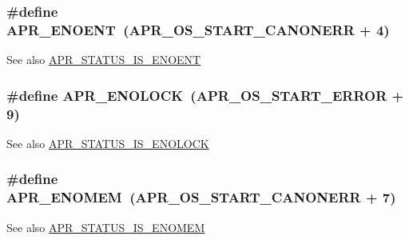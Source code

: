 \subsubsection[{\texorpdfstring{A\+P\+R\+\_\+\+E\+N\+O\+E\+NT}{APR_ENOENT}}]{\setlength{\rightskip}{0pt plus 5cm}\#define A\+P\+R\+\_\+\+E\+N\+O\+E\+NT~({\bf A\+P\+R\+\_\+\+O\+S\+\_\+\+S\+T\+A\+R\+T\+\_\+\+C\+A\+N\+O\+N\+E\+RR} + 4)}\hypertarget{group__APR__Error_gacc26a4afe01b6cc141f839be71fddf1c}{}\label{group__APR__Error_gacc26a4afe01b6cc141f839be71fddf1c}
\begin{DoxySeeAlso}{See also}
\hyperlink{group__APR__STATUS__IS_gad15c3b9bda78a88c02466a0d405c6047}{A\+P\+R\+\_\+\+S\+T\+A\+T\+U\+S\+\_\+\+I\+S\+\_\+\+E\+N\+O\+E\+NT} 
\end{DoxySeeAlso}
\subsubsection[{\texorpdfstring{A\+P\+R\+\_\+\+E\+N\+O\+L\+O\+CK}{APR_ENOLOCK}}]{\setlength{\rightskip}{0pt plus 5cm}\#define A\+P\+R\+\_\+\+E\+N\+O\+L\+O\+CK~({\bf A\+P\+R\+\_\+\+O\+S\+\_\+\+S\+T\+A\+R\+T\+\_\+\+E\+R\+R\+OR} + 9)}\hypertarget{group__APR__Error_ga9c411624c42f7562a5c6c3461bdcb0ec}{}\label{group__APR__Error_ga9c411624c42f7562a5c6c3461bdcb0ec}
\begin{DoxySeeAlso}{See also}
\hyperlink{group__APR__STATUS__IS_gaced66cdb08529210dbf2f6bcbba99258}{A\+P\+R\+\_\+\+S\+T\+A\+T\+U\+S\+\_\+\+I\+S\+\_\+\+E\+N\+O\+L\+O\+CK} 
\end{DoxySeeAlso}
\subsubsection[{\texorpdfstring{A\+P\+R\+\_\+\+E\+N\+O\+M\+EM}{APR_ENOMEM}}]{\setlength{\rightskip}{0pt plus 5cm}\#define A\+P\+R\+\_\+\+E\+N\+O\+M\+EM~({\bf A\+P\+R\+\_\+\+O\+S\+\_\+\+S\+T\+A\+R\+T\+\_\+\+C\+A\+N\+O\+N\+E\+RR} + 7)}\hypertarget{group__APR__Error_ga6a453e60000000609a95817efabebf4f}{}\label{group__APR__Error_ga6a453e60000000609a95817efabebf4f}
\begin{DoxySeeAlso}{See also}
\hyperlink{group__APR__STATUS__IS_ga38ab0ab9f00c849f24aae626f5118fce}{A\+P\+R\+\_\+\+S\+T\+A\+T\+U\+S\+\_\+\+I\+S\+\_\+\+E\+N\+O\+M\+EM} 
\end{DoxySeeAlso}
